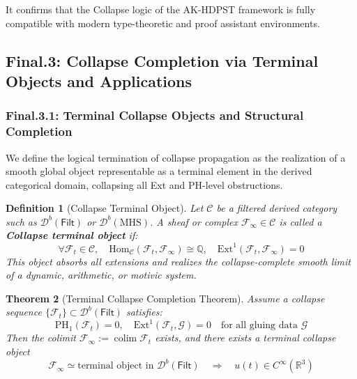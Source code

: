 \documentclass[11pt]{article}
\DeclareMathOperator{\colim}{colim}
\newtheorem{theorem}{Theorem}[section]
\newtheorem{definition}[theorem]{Definition}
\begin{document}
\begin{axiom}
\begin{axiom}
{{It confirms that the Collapse logic of the AK-HDPST framework  
is fully compatible with modern type-theoretic and proof assistant environments.






\subsection*{Final.3: Collapse Completion via Terminal Objects and Applications}

\subsubsection*{Final.3.1: Terminal Collapse Objects and Structural Completion}

We define the logical termination of collapse propagation as the realization of a smooth global object  
representable as a terminal element in the derived categorical domain, collapsing all Ext and PH-level obstructions.

\begin{definition}[Collapse Terminal Object]
Let \( \mathcal{C} \) be a filtered derived category such as \( \mathcal{D}^b(\mathsf{Filt}) \) or \( \mathcal{D}^b(\mathrm{MHS}) \).  
A sheaf or complex \( \mathcal{F}_\infty \in \mathcal{C} \) is called a \textbf{Collapse terminal object} if:
\[
\forall \mathcal{F}_t \in \mathcal{C}, \quad 
\mathrm{Hom}_{\mathcal{C}}(\mathcal{F}_t, \mathcal{F}_\infty) \cong \mathbb{Q}, \quad 
\mathrm{Ext}^1(\mathcal{F}_t, \mathcal{F}_\infty) = 0
\]
This object absorbs all extensions and realizes the collapse-complete smooth limit  
of a dynamic, arithmetic, or motivic system.
\end{definition}

\begin{theorem}[Terminal Collapse Completion Theorem]
Assume a collapse sequence \( \{\mathcal{F}_t\} \subset \mathcal{D}^b(\mathsf{Filt}) \) satisfies:
\[
\mathrm{PH}_1(\mathcal{F}_t) = 0, \quad 
\mathrm{Ext}^1(\mathcal{F}_t, \mathcal{G}) = 0 \quad \text{for all gluing data } \mathcal{G}
\]
Then the colimit \( \mathcal{F}_\infty := \colim \mathcal{F}_t \) exists, and there exists a terminal collapse object  
\[
\mathcal{F}_\infty \simeq \text{terminal object in } \mathcal{D}^b(\mathsf{Filt})
\quad \Rightarrow \quad u(t) \in C^\infty(\mathbb{R}^3)
\]
\end{theorem}

}}
\end{axiom}
\end{axiom}
\end{document}
